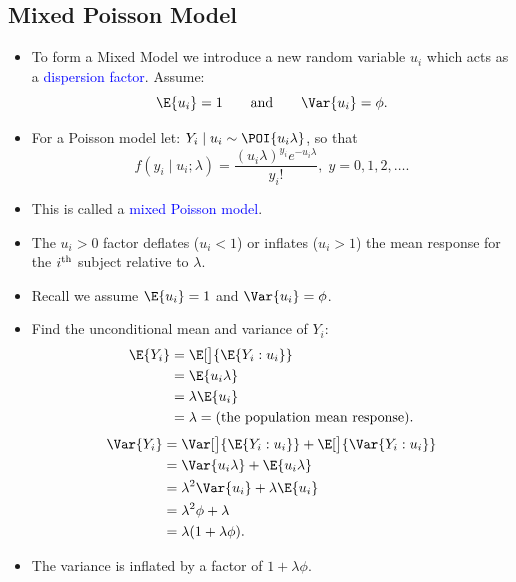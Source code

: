 \documentclass[oneside]{book}\usepackage[]{graphicx}\usepackage[svgnames]{xcolor}
\providecommand\given{} %
\renewcommand\given{\nonscript\:\delimsize\vert\nonscript\:\mathopen{}}%
\renewcommand\given{\nonscript\:\delimsize\vert\nonscript\:\mathopen{}}%
\renewcommand\given{\nonscript\:\delimsize\vert\nonscript\:\mathopen{}}%
\renewcommand\given{\nonscript\:\delimsize\vert\nonscript\:\mathopen{}}%
\renewcommand\given{\nonscript\:\delimsize\vert\nonscript\:\mathopen{}}%
\renewcommand\given{\nonscript\:\delimsize\vert\nonscript\:\mathopen{}}%
\renewcommand\given{\nonscript\:\delimsize\vert\nonscript\:\mathopen{}}%
\renewcommand\given{\nonscript\:\delimsize\vert\nonscript\:\mathopen{}}%
\renewcommand\given{\nonscript\:\delimsize\vert\nonscript\:\mathopen{}}%
\renewcommand\given{\nonscript\:\delimsize\vert\nonscript\:\mathopen{}}%
\renewcommand\given{\nonscript\:\delimsize\vert\nonscript\:\mathopen{}}%
\renewcommand\given{\nonscript\:\delimsize\vert\nonscript\:\mathopen{}}%
\renewcommand\given{:}
\begin{document}
\subsection*{Mixed Poisson Model}
\begin{itemize}
    \item To form a Mixed Model we introduce a new random variable $ u_i $ which acts as a
          \textcolor{Blue}{dispersion factor}. Assume:
          \[ \E{u_i}=1\qquad \text{and}\qquad \Var{u_i}=\phi. \]
    \item For a Poisson model let: $ Y_i\mid u_i \sim \POI{u_i\lambda} $, so that
          \[ f(y_i\mid u_i;\lambda)=\frac{(u_i\lambda)^{y_i}e^{-u_i\lambda}}{y_i!},\; y=0,1,2,\ldots. \]
    \item This is called a \textcolor{Blue}{mixed Poisson model}.
    \item The $ u_i>0 $ factor deflates ($ u_i<1 $) or inflates ($ u_i>1 $) the mean response for the $ i\textsuperscript{th} $ subject relative to $ \lambda $.
    \item Recall we assume $ \E{u_i}=1 $ and $ \Var{u_i}=\phi $.
    \item Find the unconditional mean and variance of $ Y_i $:
          \begin{align*}
              \E{Y_i}
               & =\E[\big]{\E{Y_i\given u_i}}                    \\
               & =\E{u_i\lambda}                                 \\
               & =\lambda\E{u_i}                                 \\
               & =\lambda=\text{(the population mean response)}.
          \end{align*}
          \begin{align*}
              \Var{Y_i}
               & =\Var[\big]{\E{Y_i\given u_i}}+\E[\big]{\Var{Y_i\given u_i}} \\
               & =\Var{u_i\lambda}+\E{u_i\lambda}                             \\
               & =\lambda^2\Var{u_i}+\lambda\E{u_i}                           \\
               & =\lambda^2 \phi+\lambda                                      \\
               & =\lambda(1+\lambda \phi).
          \end{align*}
    \item The variance is inflated by a factor of $ 1+\lambda\phi $.

\end{itemize}
\end{document}
